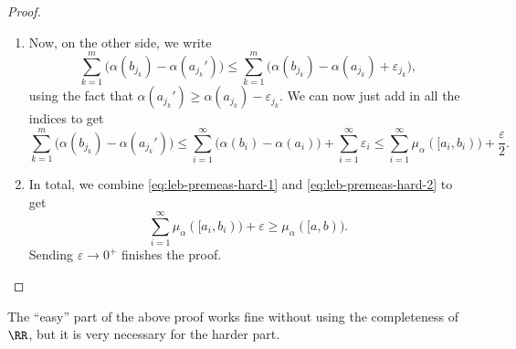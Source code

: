 \documentclass[../notes.tex]{subfiles}
\begin{document}
\begin{proof}
\begin{itemize}
\begin{enumerate}
			\item Now, on the other side, we write
			\[\sum_{k=1}^m\big(\alpha(b_{j_k})-\alpha(a_{j_k}')\big)\le\sum_{k=1}^m\big(\alpha(b_{j_k})-\alpha(a_{j_k})+\varepsilon_{j_k}\big),\]
			using the fact that $\alpha(a_{j_k}')\ge\alpha(a_{j_k})-\varepsilon_{j_k}$. We can now just add in all the indices to get
			\begin{equation}
				\sum_{k=1}^m\big(\alpha(b_{j_k})-\alpha(a_{j_k}')\big)\le\sum_{i=1}^\infty\big(\alpha(b_{i})-\alpha(a_{i})\big)+\sum_{i=1}^\infty\varepsilon_i\le\sum_{i=1}^\infty\mu_\alpha([a_i,b_{i}))+\frac\varepsilon2. \label{eq:leb-premeas-hard-2}
			\end{equation}
			
			\item In total, we combine \autoref{eq:leb-premeas-hard-1} and \autoref{eq:leb-premeas-hard-2} to get
			\[\sum_{i=1}^\infty\mu_\alpha([a_{i},b_{i}))+\varepsilon\ge\mu_\alpha([a,b)).\]
			Sending $\varepsilon\to0^+$ finishes the proof.
			\qedhere
		\end{enumerate}
	\end{itemize}
\end{proof}
\begin{remark}
	The ``easy'' part of the above proof works fine without using the completeness of $\RR$, but it is very necessary for the harder part.
\end{remark}
\end{document}

